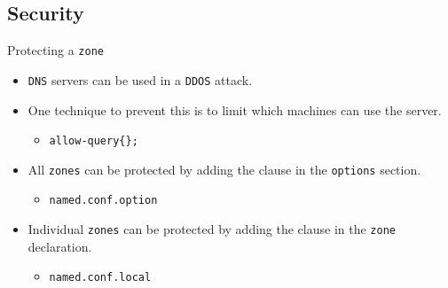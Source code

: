 \documentclass[aspectratio=169,xcolor=table]{beamer}
\begin{document}
\subsection{Security}
\begin{frame}{Protecting a \texttt{zone}}
  \begin{itemize}
    \item \texttt{DNS} servers can be used in a \texttt{DDOS} attack.
    \item One technique to prevent this is to limit which machines can use the server.
      \begin{itemize}
        \item \texttt{allow-query\{\};}
      \end{itemize}
    \item All \texttt{zones} can be protected by adding the clause in the \texttt{options} section.  
      \begin{itemize}
        \item \texttt{named.conf.option}
      \end{itemize}
    \item Individual \texttt{zones} can be protected by adding the clause in the \texttt{zone} declaration.  
    \begin{itemize}
      \item \texttt{named.conf.local}
    \end{itemize}
  \end{itemize}
\end{frame}
\end{document}
